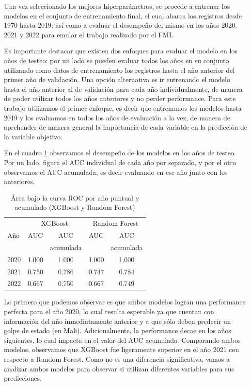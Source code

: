 \documentclass{article}
\begin{document}
Una vez seleccionado los mejores hiperparámetros, se procede a entrenar los modelos en el
conjunto de entrenamiento final, el cual abarca los registros desde 1970 hasta 2019; así
como a evaluar el desempeño del mismo en los años 2020, 2021 y 2022 para emular el trabajo
realizado por el FMI.

Es importante destacar que existen dos enfoques para evaluar el modelo en los años de
testeo: por un lado se pueden evaluar todos los años en su conjunto utilizando como datos
de entrenamiento los registros hasta el año anterior del primer año de validación. Una
opción alternativa es ir entrenando el modelo hasta el año anterior al de validación para
cada año individualmente, de manera de poder utilizar todos los años anteriores y no 
perder performance. Para este trabajo utilizamos el primer enfoque, es decir que entrenamos los 
modelos hasta 2019 y los evaluamos en todos los años de evaluación a la vez, de manera de
aprehender de manera general la importancia de cada variable en la predicción de la
variable objetivo.

En el cuadro \ref{tab:performance} observamos el desempeño de los modelos en los años
de testeo. Por un lado, figura el AUC individual de cada año por separado, y por el otro
observamos el AUC acumulada, es decir evaluando en ese año junto con los anteriores.

\begin{table}[H]
 \centering
  \begin{tabular}{lcccc}
   \toprule
   & \multicolumn{2}{c}{XGBoost} & \multicolumn{2}{c}{Random Forest} \\
   Año & AUC   & AUC   & AUC   & AUC \\
      &     & acumulada&     & acumulada \\
   \midrule
   2020 & 1.000 & 1.000 & 1.000 & 1.000 \\
   2021 & 0.750 & 0.786 & 0.747 & 0.784 \\
   2022 & 0.667 & 0.750 & 0.667 & 0.749 \\
   \bottomrule
  \end{tabular}
 \caption{Área bajo la curva ROC por año puntual y acumulado (XGBoost y 
 Random Forest) \label{tab:performance}}
\end{table}

Lo primero que podemos observar es que ambos modelos logran una performance perfecta 
para el año 2020, lo cual resulta esperable ya que cuentan con información del año 
inmediatamente anterior y a que sólo deben predecir un golpe de estado (en Mali).
Adicionalmente, la performance decae en los años siguientes, 
lo cual impacta en el valor del AUC acumulada. Comparando ambos modelos, observamos
que XGBoost fue ligeramente superior en el año 2021 con respecto a Random Forest.
Como no es una diferencia significativa, vamos a analizar ambos modelos para observar
si utilizan diferentes variables para sus predicciones.
\end{document}
